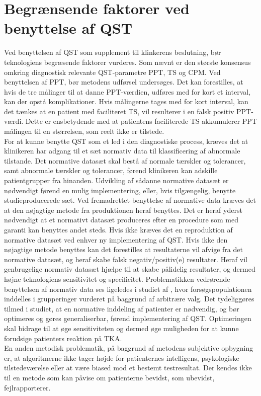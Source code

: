 \section{Begrænsende faktorer ved benyttelse af QST}
Ved benyttelsen af QST som supplement til klinkerens beslutning, bør teknologiens begræsende faktorer vurderes. Som nævnt er den største konsensus omkring diagnostisk relevante QST-parametre PPT, TS og CPM. Ved benyttelsen af PPT, bør metodens udførsel undersøges. Det kan forestilles, at hvis de tre målinger til at danne PPT-værdien, udføres med for kort et interval, kan der opstå komplikationer. Hvis målingerne tages med for kort interval, kan det tænkes at en patient med faciliteret TS, vil resulterer i en falsk positiv PPT-værdi. Dette er ensbetydende med at patientens faciliterede TS akkumulerer PPT målingen til en størrelsen, som reelt ikke er tilstede. \\
For at kunne benytte QST som et led i den diagnostiske process, kræves det at klinikeren har adgang til et sæt normativ data til klassificering af abnormale tilstande. Det normative datasæt skal bestå af normale tærskler og tolerancer, samt abnormale tærskler og tolerancer, førend klinikeren kan adskille patientgrupper fra hinanden. Udvikling af sådanne normative datasæt er nødvendigt førend en mulig implementering, eller, hvis tilgængelig, benytte studieproducerede sæt. Ved fremadrettet benyttelse af normative data kræves det at den nøjagtige metode fra produktionen heraf benyttes. Det er heraf yderst nødvendigt at et normativt datasæt produceres efter en procedure som med garanti kan benyttes andet steds. Hvis ikke kræves det en reproduktion af normative datasæt ved enhver ny implementering af QST. Hvis ikke den nøjagtige metode benyttes kan det forestilles at resultaterne vil afvige fra det normative datasæt, og heraf skabe falsk negativ/positiv(e) resultater. Heraf vil genbrugelige normativ datasæt  hjælpe til at skabe pålidelig resultater, og dermed højne teknologiens sensitivitet og specificitet.  \citep{Yarnitsky1997} Problematikken vedrørende benyttelsen af normativ data ses ligeledes i studiet af , hvor forsøgspopulationen inddelles i grupperinger vurderet på baggrund af arbitrære valg. Det tydeliggøres tilmed i studiet, at en normative inddeling af patienter er nødvendig, og bør optimeres og gøres generaliserbar, førend implementering af QST. Optimeringen skal bidrage til at øge sensitiviteten og dermed øge muligheden for at kunne forudsige patienters reaktion på TKA. \\
En anden metodisk problematik, på baggrund af metodens subjektive opbygning er, at algoritmerne ikke tager højde for patienternes intelligens, psykologiske tilstedeværelse eller at være biased mod et bestemt testresultat. Der kendes ikke til en metode som kan påvise om patienterne bevidst, som ubevidst, fejlrapporterer. \citep{Dyck1998}  \\ 
